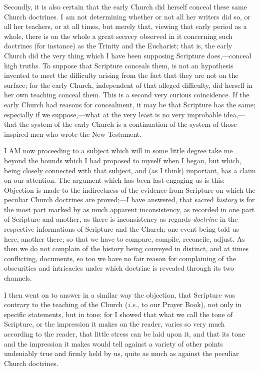 Secondly, it is also certain that the early Church did herself
conceal these same Church doctrines. I am not determining whether or
not all her writers did so, or all her teachers, or at all times, but
merely that, viewing that early period as a whole, there is on the
whole a great secrecy observed in it concerning such doctrines (for
instance) as the Trinity and the Eucharist; that is, the early Church
did the very thing which I have been supposing Scripture does,—conceal
high truths. To suppose that Scripture conceals them, is not an
hypothesis invented to meet the difficulty arising from the fact that
they are not on the surface; for the early Church, independent of that
alleged difficulty, did herself in her own teaching conceal them. This
is a second very curious coincidence. If the early Church had reasons
for concealment, it may be that Scripture has the same; especially if
we suppose,—what at the very least is no very improbable idea,—that
the system of the early Church is a continuation of the system of
those inspired men who wrote the New Testament.


I AM now proceeding to a subject which will in some little
degree take me beyond the bounds which I had proposed to myself when I
began, but which, being closely connected with that subject, and (as I
think) important, has a claim on our attention. The argument which has
been last engaging us is this: Objection is made to the indirectness
of the evidence from Scripture on which the peculiar Church doctrines
are proved;—I have answered, that sacred \emph{history} is for the most
part marked by as much apparent inconsistency, as recorded in one part
of Scripture and another, as there is inconsistency as regards \emph{doctrine} in the respective informations of Scripture and the Church;
one event being told us here, another there; so that we have to
compare, compile, reconcile, adjust. As then we do not complain of the
history being conveyed in distinct, and at times conflicting,
documents, so too we have no fair reason for complaining of the
obscurities and intricacies under which doctrine is revealed through
its two channels.

I then went on to answer in a similar way the objection, that
Scripture was contrary to the teaching of the Church (\emph{i.e}., to our
Prayer Book), not only in specific statements, but in tone; for I
showed that what we call the tone of Scripture, or the impression it
makes on the reader, varies so very much according to the reader,
that little stress can be laid upon it, and that its tone and
the impression it makes would tell against a variety of other points
undeniably true and firmly held by us, quite as much as against the
peculiar Church doctrines.

